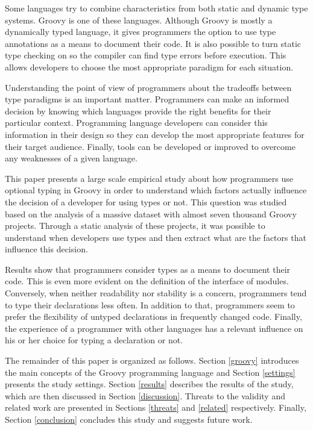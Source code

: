 \documentclass[preprint]{sigplanconf}
\begin{document}
Some languages try to combine characteristics from both static and dynamic type systems.
Groovy \cite{groovy} is one of these languages.
Although Groovy is mostly a dynamically typed language, it gives programmers the option to use type annotations as a means to document their code.
It is also possible to turn static type checking on so the compiler can find type errors before execution.
This allows developers to choose the most appropriate paradigm for each situation.

Understanding the point of view of programmers about the tradeoffs between type paradigms is an important matter.
Programmers can make an informed decision by knowing which languages provide the right benefits for their particular context.
Programming language developers can consider this information in their design so they can develop the most appropriate features for their target audience.
Finally, tools can be developed or improved to overcome any weaknesses of a given language. 

This paper presents a large scale empirical study about how programmers use optional typing in Groovy in order to understand which factors actually influence the decision of a developer for using types or not. 
This question was studied based on the analysis of a massive dataset with almost seven thousand Groovy projects.
Through a static analysis of these projects, it was possible to understand when developers use types and then extract what are the factors that influence this decision.

Results show that programmers consider types as a means to document their code.
This is even more evident on the definition of the interface of modules.
Conversely, when neither readability nor stability is a concern, programmers tend to type their declarations less often.
In addition to that, programmers seem to prefer the flexibility of untyped declarations in frequently changed code.
Finally, the experience of a programmer with other languages has a relevant influence on his or her choice for typing a declaration or not.

The remainder of this paper is organized as follows. 
Section \ref{groovy} introduces the main concepts of the Groovy programming language and Section \ref{settings} presents the study settings.
Section \ref{results} describes the results of the study, which are then discussed in Section \ref{discussion}.
Threats to the validity and related work are presented in Sections \ref{threats} and \ref{related} respectively.
Finally, Section \ref{conclusion} concludes this study and suggests future work.
\end{document}

